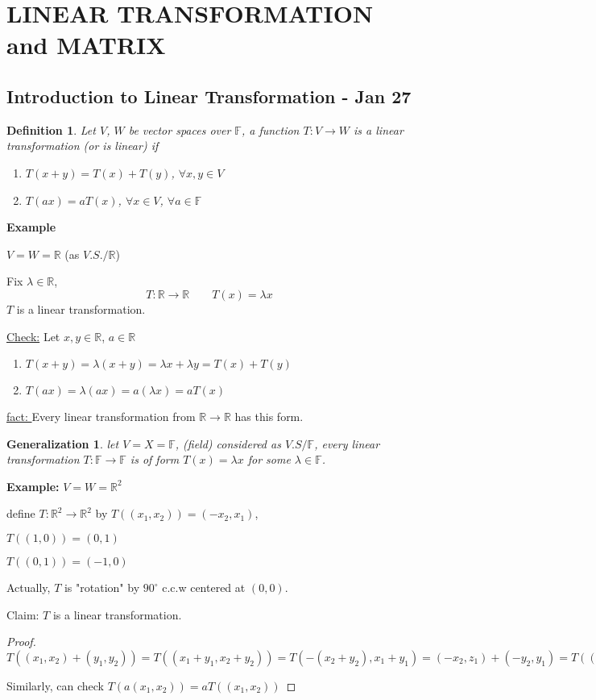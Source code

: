 \documentclass[12pt]{article}
\newtheorem{definition}{Definition}[subsection]
\newtheorem{generalization}{Generalization}[subsection]
\newcommand{\mR}{{\mathbb{R}}}
\newcommand{\mF}{{\mathbb{F}}}
\begin{document}
	\newpage
	\section{LINEAR TRANSFORMATION and MATRIX}
	\subsection{Introduction to Linear Transformation - Jan 27}
	\begin{definition}
		Let $V$, $W$ be vector spaces over $\mF$, a function $T:V\to W$
		is a linear transformation (or is linear) if 
		\begin{enumerate}
			\item $T(x+y) = T(x) + T(y)$, $\forall x, y \in V$
			\item $T(ax) = aT(x)$, $\forall x\in V$, $\forall a \in \mF$\\
		\end{enumerate}
	\end{definition}

	{\color{Brown}
		\textbf{Example }

		$V=W=\mR$ (as $V.S. / \mR$) 
	
		Fix $\lambda \in \mR$, 
		\[
			T:\mR \to \mR \qquad T(x) = \lambda x
		\]
		$T$ is a linear transformation. 

		\underline{Check:} Let $x, y \in \mR$, $a \in \mR$
		\begin{enumerate}
			\item $T(x+y) = \lambda (x+y) = \lambda x+\lambda y =T(x) + T(y)$
			\item $T(ax) = \lambda (ax) = a(\lambda x) = aT(x)$
		\end{enumerate}
	}
	\underline{fact: }Every linear transformation from $\mR \to \mR$ 
	has this form. \\

	\begin{generalization}
	let $V = X = \mF$, (field) considered as 
	$V.S / \mF$, every linear transformation $T:\mF \to \mF$ 
	is of form $T(x) = \lambda x$ for some $\lambda \in \mF$. \\
	\end{generalization}
	

	{\color{Brown}
	\textbf{Example: }
	$V = W = \mR^2$
	
	define $T : \mR^2 \to \mR^2$ by $T((x_1, x_2)) = (-x_2 , x_1)$,

	$T((1,0)) = (0,1)$

	$T((0,1)) = (-1,0)$ 

	Actually, $T$ is "rotation" by $90^{\circ}$
	c.c.w centered at $(0,0)$.

	Claim: $T$ is a linear transformation.

	\begin{proof}
		$T((x_1,x_2)+(y_1, y_2)) = T((x_1+y_1, x_2+y_2)) = T(-(x_2+y_2),
		x_1+y_1) = (-x_2,z_1)+(-y_2,y_1) = T((x_1,x_2)) + T((y_1,y_2))$

		Similarly, can check $T(a(x_1,x_2)) = aT((x_1,x_2))$
	\end{proof}

	}
\end{document}
